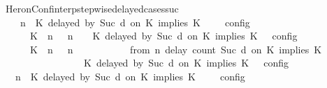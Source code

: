 \begin{isabellebody}
\ HeronConf{\isacharunderscore}interp{\isacharunderscore}stepwise{\isacharunderscore}delayed{\isacharunderscore}cases{\isacharunderscore}suc{\isacharcolon}\isanewline
\ \ {\isacartoucheopen}{\isasymlbrakk}\ {\isasymGamma}{\isacharcomma}\ n\ {\isasymturnstile}\ {\isacharparenleft}{\isacharparenleft}K\ delayed\ by\ {\isacharparenleft}Suc\ d{\isacharparenright}\ on\ K\ implies\ K\ {\isacharhash}\ {\isasymPsi}{\isacharparenright}\ {\isasymtriangleright}\ {\isasymPhi}\ {\isasymrbrakk}\isactrlsub c\isactrlsub o\isactrlsub n\isactrlsub f\isactrlsub i\isactrlsub g\isanewline
\ \ \ \ {\isacharequal}\ {\isasymlbrakk}\ {\isacharparenleft}{\isacharparenleft}K\ {\isasymnot}{\isasymUp}\ n{\isacharparenright}\ {\isacharhash}\ {\isasymGamma}{\isacharparenright}{\isacharcomma}\ n\ {\isasymturnstile}\ {\isasymPsi}\ {\isasymtriangleright}\ {\isacharparenleft}{\isacharparenleft}K\ delayed\ by\ {\isacharparenleft}Suc\ d{\isacharparenright}\ on\ K\ implies\ K\ {\isacharhash}\ {\isasymPhi}{\isacharparenright}\ {\isasymrbrakk}\isactrlsub c\isactrlsub o\isactrlsub n\isactrlsub f\isactrlsub i\isactrlsub g\isanewline
\ \ \ \ {\isasymunion}\ {\isasymlbrakk}\ {\isacharparenleft}{\isacharparenleft}K\ {\isasymUp}\ n{\isacharparenright}\ {\isacharhash}\ {\isasymGamma}{\isacharparenright}{\isacharcomma}\ n\isanewline
\ \ \ \ \ \ \ \ {\isasymturnstile}\ {\isasymPsi}\ {\isasymtriangleright}\ {\isacharparenleft}{\isacharparenleft}from\ n\ delay\ count\ {\isacharparenleft}Suc\ d{\isacharparenright}\ on\ K\ implies\ K\isanewline
\ \ \ \ \ \ \ \ \ \ \ \ \ \ \ \ {\isacharhash}\ {\isacharparenleft}K\ delayed\ by\ {\isacharparenleft}Suc\ d{\isacharparenright}\ on\ K\ implies\ K\ {\isacharhash}\ {\isasymPhi}{\isacharparenright}\ {\isasymrbrakk}\isactrlsub c\isactrlsub o\isactrlsub n\isactrlsub f\isactrlsub i\isactrlsub g\isanewline
\ \ {\isacartoucheclose}\isanewline
%
\isadelimproof
%
\endisadelimproof
%
\isatagproof
{}\isamarkupfalse%
\ {\isacharminus}\isanewline
\ \ \isamarkupfalse%
\ {\isacartoucheopen}{\isasymlbrakk}\ {\isasymGamma}{\isacharcomma}\ n\ {\isasymturnstile}\ {\isacharparenleft}{\isacharparenleft}K\ delayed\ by\ {\isacharparenleft}Suc\ d{\isacharparenright}\ on\ K\ implies\ K\ {\isacharhash}\ {\isasymPsi}{\isacharparenright}\ {\isasymtriangleright}\ {\isasymPhi}\ {\isasymrbrakk}\isactrlsub c\isactrlsub o\isactrlsub n\isactrlsub f\isactrlsub i\isactrlsub g\isanewline

\end{isabellebody}
